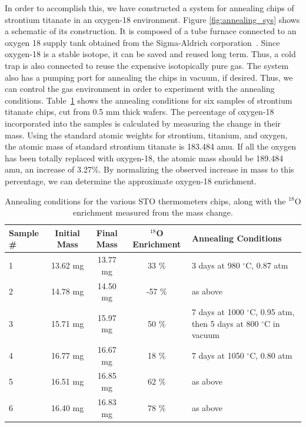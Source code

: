 \documentclass{thesis-umich}
\begin{document}
In order to accomplish this, we have constructed a system for annealing chips of strontium titanate in an oxygen-18 environment. Figure \ref{fig:annealing_sys} shows a schematic of its construction. It is composed of a tube furnace connected to an oxygen 18 supply tank obtained from the Sigma-Aldrich corporation~\cite{Sigma18O}. Since oxygen-18 is a stable isotope, it can be saved and reused long term. Thus, a cold trap is also connected to reuse the expensive isotopically pure gas. The system also has a pumping port for annealing the chips in vacuum, if desired. Thus, we can control the gas environment in order to experiment with the annealing conditions. Table~\ref{tab:annealed_sto} shows the annealing conditions for six samples of strontium titanate chips, cut from 0.5 mm thick wafers. The percentage of oxygen-18 incorporated into the samples is calculated by measuring the change in their mass. Using the standard atomic weights for strontium, titanium, and oxygen, the atomic mass of standard strontium titanate is 183.484 amu. If all the oxygen has been totally replaced with oxygen-18, the atomic mass should be 189.484 amu, an increase of 3.27\%. By normalizing the observed increase in mass to this percentage, we can determine the approximate oxygen-18 enrichment.

\begin{table}
	\begin{tabular}{|l|c|c|c|p{}|}
		\hline
		Sample \# & Initial Mass & Final Mass & $^{18}$O Enrichment & Annealing Conditions \\
		\hline
		1 & 13.62 mg & 13.77 mg & 33 \% & 3 days at 980 $^\circ$C, 0.87 atm \\
		2 & 14.78 mg & 14.50 mg & -57 \% & as above \\
		3 & 15.71 mg & 15.97 mg & 50 \% & 7 days at 1000 $^\circ$C, 0.95 atm, then 5 days at 800 $^\circ$C in vacuum \\
		4 & 16.77 mg & 16.67 mg & 18 \% & 7 days at 1050 $^\circ$C, 0.80 atm \\
		5 & 16.51 mg & 16.85 mg & 62 \% & as above \\
		6 & 16.40 mg & 16.83 mg & 78 \% & as above \\
		\hline
	\end{tabular}
	\caption[Annealed STO Thermometers]{Annealing conditions for the various STO thermometers chips, along with the $^{18}$O enrichment measured from the mass change.}
	\label{tab:annealed_sto}
\end{table}
\end{document}
